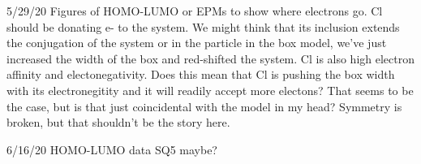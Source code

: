 5/29/20
Figures of HOMO-LUMO or EPMs to show where electrons go. Cl should be donating e- to the system. We might think that its inclusion extends the conjugation of the system or in the particle in the box model, we've just increased the width of the box and red-shifted the system. Cl is also high electron affinity and electonegativity. Does this mean that Cl is pushing the box width with its electronegitity and it will readily accept more electons?  That seems to be the case, but is that just coincidental with the model in my head? Symmetry is broken, but that shouldn't be the story here. 

6/16/20
HOMO-LUMO data
SQ5 maybe?